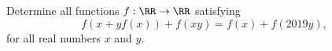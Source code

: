 Determine all functions $f:\RR \to \RR$ satisfying
$$f(x+yf(x)) + f(xy) = f(x) + f(2019y),$$
for all real numbers $x$ and $y$.